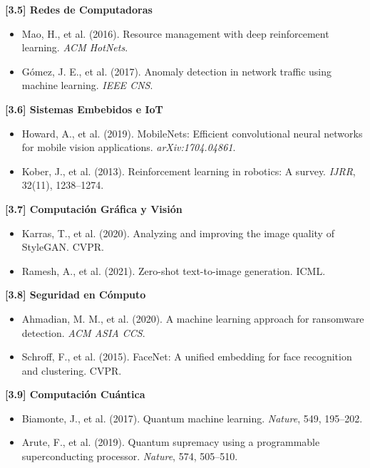 \documentclass[12pt,a4paper]{report}
\numberwithin{figure}{section}
\begin{document}
\textbf{[3.5] Redes de Computadoras}
\label{ref:3.5}
\begin{itemize}
  \item Mao, H., et al. (2016). Resource management with deep reinforcement learning. \textit{ACM HotNets}.
  \item Gómez, J. E., et al. (2017). Anomaly detection in network traffic using machine learning. \textit{IEEE CNS}.
\end{itemize}

\textbf{[3.6] Sistemas Embebidos e IoT}
\label{ref:3.6}
\begin{itemize}
  \item Howard, A., et al. (2019). MobileNets: Efficient convolutional neural networks for mobile vision applications. \textit{arXiv:1704.04861}.
  \item Kober, J., et al. (2013). Reinforcement learning in robotics: A survey. \textit{IJRR}, 32(11), 1238–1274.
\end{itemize}

\textbf{[3.7] Computación Gráfica y Visión}
\label{ref:3.7}
\begin{itemize}
  \item Karras, T., et al. (2020). Analyzing and improving the image quality of StyleGAN. CVPR.
  \item Ramesh, A., et al. (2021). Zero-shot text-to-image generation. ICML.
\end{itemize}

\textbf{[3.8] Seguridad en Cómputo}
\label{ref:3.8}
\begin{itemize}
  \item Ahmadian, M. M., et al. (2020). A machine learning approach for ransomware detection. \textit{ACM ASIA CCS}.
  \item Schroff, F., et al. (2015). FaceNet: A unified embedding for face recognition and clustering. CVPR.
\end{itemize}

\textbf{[3.9] Computación Cuántica}
\label{ref:3.9}
\begin{itemize}
  \item Biamonte, J., et al. (2017). Quantum machine learning. \textit{Nature}, 549, 195–202.
  \item Arute, F., et al. (2019). Quantum supremacy using a programmable superconducting processor. \textit{Nature}, 574, 505–510.
\end{itemize}

\end{document}
